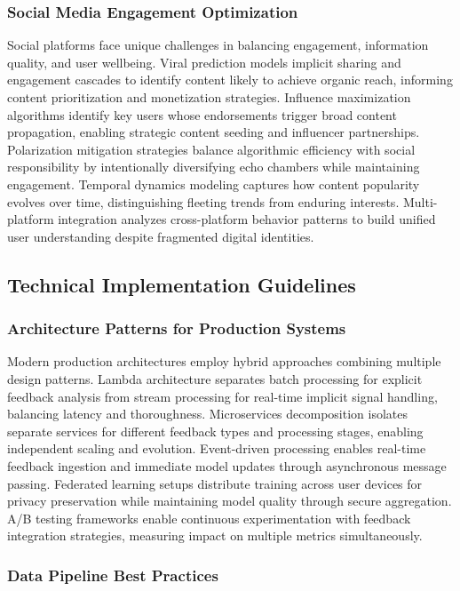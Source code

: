 \subsubsection{Social Media Engagement Optimization}

Social platforms face unique challenges in balancing engagement, information quality, and user wellbeing. Viral prediction models implicit sharing and engagement cascades to identify content likely to achieve organic reach, informing content prioritization and monetization strategies. Influence maximization algorithms identify key users whose endorsements trigger broad content propagation, enabling strategic content seeding and influencer partnerships. Polarization mitigation strategies balance algorithmic efficiency with social responsibility by intentionally diversifying echo chambers while maintaining engagement. Temporal dynamics modeling captures how content popularity evolves over time, distinguishing fleeting trends from enduring interests. Multi-platform integration analyzes cross-platform behavior patterns to build unified user understanding despite fragmented digital identities.

\subsection{Technical Implementation Guidelines}

\subsubsection{Architecture Patterns for Production Systems}

Modern production architectures employ hybrid approaches combining multiple design patterns. Lambda architecture separates batch processing for explicit feedback analysis from stream processing for real-time implicit signal handling, balancing latency and thoroughness. Microservices decomposition isolates separate services for different feedback types and processing stages, enabling independent scaling and evolution. Event-driven processing enables real-time feedback ingestion and immediate model updates through asynchronous message passing. Federated learning setups distribute training across user devices for privacy preservation while maintaining model quality through secure aggregation. A/B testing frameworks enable continuous experimentation with feedback integration strategies, measuring impact on multiple metrics simultaneously.

\subsubsection{Data Pipeline Best Practices}

